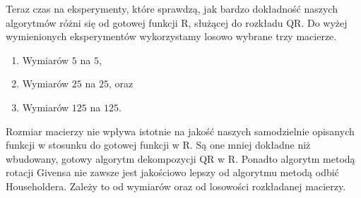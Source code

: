 \documentclass[notheorems]{beamer}
\begin{document}
\begin{frame}
Teraz czas na eksperymenty, które sprawdzą, jak bardzo dokładność naszych algorytmów różni się od gotowej funkcji R, służącej do rozkładu QR.
Do wyżej wymienionych eksperymentów wykorzystamy losowo wybrane trzy macierze.
\begin{enumerate}
\item Wymiarów $5$ na $5$,
\item Wymiarów $25$ na $25$, oraz
\item Wymiarów $125$ na $125$.
\end{enumerate}
\end{frame}


\begin{frame}
Rozmiar macierzy nie wpływa istotnie na jakość naszych samodzielnie opisanych funkcji w stosunku do gotowej funkcji w R. Są one mniej dokładne niż wbudowany, gotowy algorytm dekompozycji QR w R. Ponadto algorytm metodą rotacji Givensa nie zawsze jest jakościowo lepszy od algorytmu metodą odbić Householdera. Zależy to od wymiarów oraz od losowości rozkładanej macierzy.
\end{frame}
\end{document}
